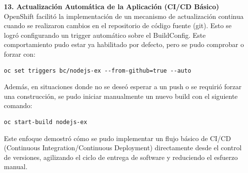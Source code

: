 \vspace{0.5cm}
\noindent\textbf{13. Actualización Automática de la Aplicación (CI/CD Básico)} \\
    
OpenShift facilitó la implementación de un mecanismo de actualización continua cuando se realizaron cambios en el repositorio de código fuente (git). Esto se logró configurando un trigger automático sobre el BuildConfig. Este comportamiento pudo estar ya habilitado por defecto, pero se pudo comprobar o forzar con: 
    \begin{verbatim}
oc set triggers bc/nodejs-ex --from-github=true --auto
    \end{verbatim}

    Además, en situaciones donde no se deseó esperar a un push o se requirió forzar una construcción, se pudo iniciar manualmente un nuevo build con el siguiente comando:
    \begin{verbatim}
oc start-build nodejs-ex
    \end{verbatim}

    Este enfoque demostró cómo se pudo implementar un flujo básico de CI/CD (Continuous Integration/Continuous Deployment) directamente desde el control de versiones, agilizando el ciclo de entrega de software y reduciendo el esfuerzo manual.

\newpage